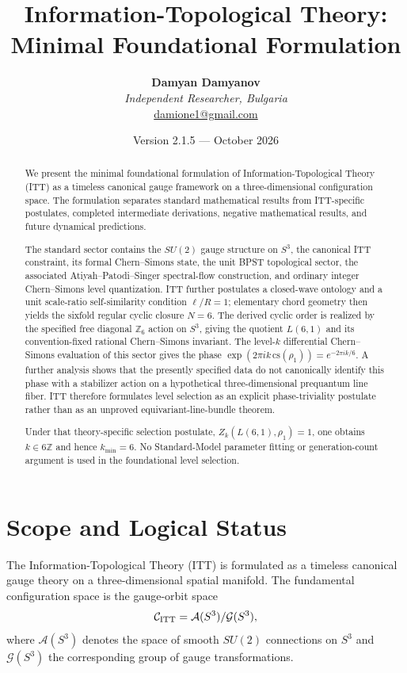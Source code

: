 \documentclass[11pt,a4paper]{article}
\title{\textbf{Information-Topological Theory: Minimal Foundational Formulation}}
\author{\textbf{Damyan Damyanov}\\
\small\textit{Independent Researcher, Bulgaria}\\
\small\href{mailto:damione1@gmail.com}{damione1@gmail.com}}
\date{Version 2.1.5 --- October 2026}
\begin{document}
\maketitle

\begin{abstract}
We present the minimal foundational formulation of Information-Topological Theory (ITT) as a timeless canonical gauge framework on a three-dimensional configuration space. The formulation separates standard mathematical results from ITT-specific postulates, completed intermediate derivations, negative mathematical results, and future dynamical predictions.

The standard sector contains the $SU(2)$ gauge structure on $S^3$, the canonical ITT constraint, its formal Chern--Simons state, the unit BPST topological sector, the associated Atiyah--Patodi--Singer spectral-flow construction, and ordinary integer Chern--Simons level quantization. ITT further postulates a closed-wave ontology and a unit scale-ratio self-similarity condition $\ell/R=1$; elementary chord geometry then yields the sixfold regular cyclic closure $N=6$. The derived cyclic order is realized by the specified free diagonal $\mathbb Z_6$ action on $S^3$, giving the quotient $L(6,1)$ and its convention-fixed rational Chern--Simons invariant. The level-$k$ differential Chern--Simons evaluation of this sector gives the phase $\exp(2\pi i k\,\mathrm{cs}(\rho_1))=e^{-2\pi i k/6}$. A further analysis shows that the presently specified data do not canonically identify this phase with a stabilizer action on a hypothetical three-dimensional prequantum line fiber. ITT therefore formulates level selection as an explicit phase-triviality postulate rather than as an unproved equivariant-line-bundle theorem.

Under that theory-specific selection postulate, $Z_k(L(6,1),\rho_1)=1$, one obtains $k\in6\mathbb Z$ and hence $k_{\min}=6$. No Standard-Model parameter fitting or generation-count argument is used in the foundational level selection.
\end{abstract}

\section{Scope and Logical Status}

The Information-Topological Theory (ITT) is formulated as a timeless canonical gauge theory on a three-dimensional spatial manifold. The fundamental configuration space is the gauge-orbit space
\begin{equation}
\mathcal C_{\rm ITT}=\mathcal A(S^3)/\mathcal G(S^3),
\end{equation}
where $\mathcal A(S^3)$ denotes the space of smooth $SU(2)$ connections on $S^3$ and $\mathcal G(S^3)$ the corresponding group of gauge transformations.
\end{document}
